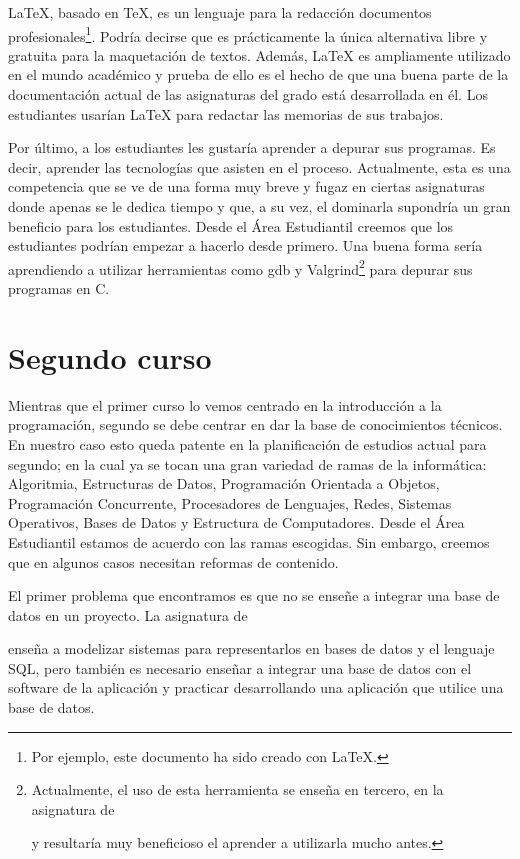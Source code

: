 \LaTeX, basado en \TeX, es un lenguaje para
la redacción documentos profesionales\footnote{
    Por ejemplo, este documento ha sido creado con \LaTeX.
}.
Podría decirse que es prácticamente la única alternativa
libre y gratuita para la maquetación de textos.
Además, \LaTeX{} es ampliamente utilizado en el mundo académico y prueba de
ello es el hecho de que una buena parte de la documentación actual de las
 asignaturas del grado está desarrollada en él.
Los estudiantes usarían \LaTeX{} para redactar las memorias de sus trabajos.

Por último, a los estudiantes les gustaría aprender a depurar sus programas.
Es decir, aprender las tecnologías que asisten en el proceso.
Actualmente, esta es una competencia que se ve de una forma muy breve y fugaz
en ciertas asignaturas donde apenas se le dedica tiempo y que, a su vez, el
dominarla supondría un gran beneficio para los estudiantes.
Desde el Área Estudiantil creemos que los estudiantes podrían empezar a
hacerlo desde primero.
Una buena forma sería
aprendiendo a utilizar herramientas como gdb y Valgrind\footnote{Actualmente,
 el uso de esta herramienta se enseña en tercero, en la asignatura de
 \subject{Ampliación de Sistemas Operativos} y resultaría muy beneficioso el
 aprender a utilizarla mucho antes.} para depurar sus programas en C.

\section{Segundo curso}

Mientras que el primer curso lo vemos centrado en
la introducción a la programación,
segundo se debe centrar en dar la base de conocimientos técnicos.
En nuestro caso esto queda patente en
la planificación de estudios actual para segundo;
en la cual ya se tocan una gran variedad de ramas de la informática:
Algoritmia, Estructuras de Datos, Programación Orientada a Objetos,
Programación Concurrente, Procesadores de Lenguajes, Redes, Sistemas Operativos,
Bases de Datos y Estructura de Computadores.
Desde el Área Estudiantil estamos de acuerdo con las ramas escogidas.
Sin embargo, creemos que en algunos casos necesitan reformas de contenido.

El primer problema que encontramos es
que no se enseñe a integrar una base de datos en un proyecto.
La asignatura de \subject{Bases de Datos} enseña a
modelizar sistemas para representarlos en bases de datos y el lenguaje SQL,
pero también es necesario enseñar a
integrar una base de datos con el software de la aplicación y
practicar desarrollando una aplicación que utilice una base de datos.

